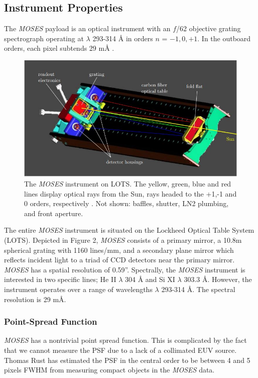 \documentclass[10pt,a4paper,titlepage]{article}
\begin{document}
		\subsection{Instrument Properties}	
			The \textit{MOSES} payload is an optical instrument with an $f$/62 objective grating spectrograph operating at $\lambda$ 293-314 {\AA} in orders $n$ = $-1,0,+1$. In the outboard orders, each pixel subtends 29 m{\AA} \cite{MOSES}.
			\begin{figure}[H]
				\includegraphics[scale=0.6]{moseslayout}
				\centering
				\caption{The \textit{MOSES} instrument on LOTS. The yellow, green, blue and red lines display optical rays from the Sun, rays headed to the +1,-1 and 0 orders, respectively \cite{MOSESPIC}. Not shown: baffles, shutter, LN2 plumbing, and front aperture.}
				\centering
			\end{figure}
			The entire \textit{MOSES} instrument is situated on the Lockheed Optical Table System (LOTS). Depicted in Figure 2, \textit{MOSES} consists of a primary mirror, a 10.8m spherical grating with 1160 lines/mm, and a secondary plane mirror which reflects incident light to a triad of CCD detectors near the primary mirror.
			\textit{MOSES} has a spatial resolution of 0.59''.
			Spectrally, the \textit{MOSES} instrument is interested in two specific lines; He II $\lambda$ 304 {\AA} and Si XI $\lambda$ 303.3 {\AA}. However, the instrument operates over a range of wavelengths $\lambda$ 293-314 {\AA}. The spectral resolution is 29 m{\AA}.
			
		\subsubsection{Point-Spread Function}
			\textit{MOSES} has a nontrivial point spread function. This is complicated by the fact that we cannot measure the PSF due to a lack of a collimated EUV source. Thomas Rust has estimated the PSF in the central order to be between 4 and 5 pixels FWHM from measuring compact objects in the \textit{MOSES} data.
			
\end{document}

